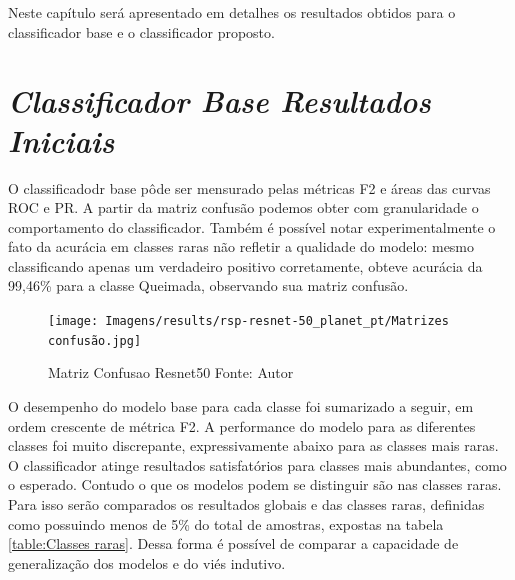 
Neste capítulo será apresentado em detalhes os resultados obtidos para o classificador base e o classificador proposto.

\section{\textit{Classificador Base Resultados Iniciais}}\label{sec:Cap4_ResultadosPreliminares}


O classificadodr base pôde ser mensurado pelas métricas F2 e áreas das curvas ROC e PR. A partir da matriz confusão podemos obter com granularidade o comportamento do classificador. Também é possível notar experimentalmente o fato da acurácia em classes raras não refletir a qualidade do modelo: mesmo classificando apenas um verdadeiro positivo corretamente, obteve acurácia da 99,46\% para a classe Queimada, observando sua matriz confusão.

\begin{figure}[!ht]
    \centering
    \texttt{[image: Imagens/results/rsp-resnet-50\_planet\_pt/Matrizes confusão.jpg]}
    \caption{ Matriz Confusao Resnet50
    Fonte: Autor}
    \label{fig:Matriz Confusao Resnet50}
\end{figure} 


O desempenho do modelo base para cada classe foi sumarizado a seguir, em ordem crescente de métrica F2. A performance do modelo para as diferentes classes foi muito discrepante, expressivamente abaixo para as classes mais raras. O classificador atinge resultados satisfatórios para classes mais abundantes, como o esperado. Contudo o que os modelos podem se distinguir são nas classes raras. Para isso serão comparados os resultados globais e das classes raras, definidas como possuindo menos de 5\% do total de amostras, expostas na tabela \ref{table:Classes raras}. Dessa forma é possível de comparar a capacidade de generalização dos modelos e do viés indutivo.

